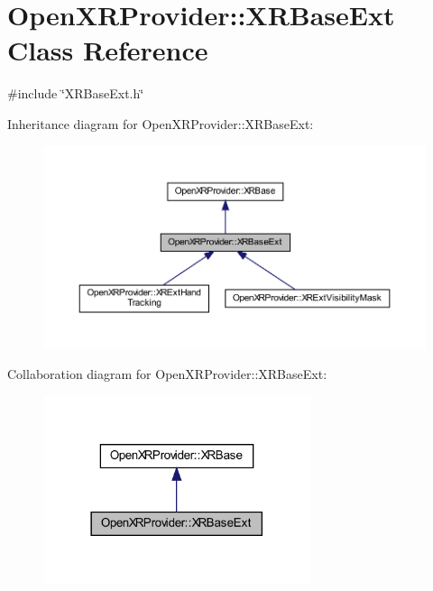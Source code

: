 \hypertarget{class_open_x_r_provider_1_1_x_r_base_ext}{}\section{Open\+X\+R\+Provider\+::X\+R\+Base\+Ext Class Reference}
\label{class_open_x_r_provider_1_1_x_r_base_ext}


{\ttfamily \#include \char`\"{}X\+R\+Base\+Ext.\+h\char`\"{}}



Inheritance diagram for Open\+X\+R\+Provider\+::X\+R\+Base\+Ext\+:\nopagebreak
\begin{figure}[H]
\begin{center}
\leavevmode
\includegraphics[width=350pt]{class_open_x_r_provider_1_1_x_r_base_ext__inherit__graph}
\end{center}
\end{figure}


Collaboration diagram for Open\+X\+R\+Provider\+::X\+R\+Base\+Ext\+:\nopagebreak
\begin{figure}[H]
\begin{center}
\leavevmode
\includegraphics[width=222pt]{class_open_x_r_provider_1_1_x_r_base_ext__coll__graph}
\end{center}
\end{figure}

